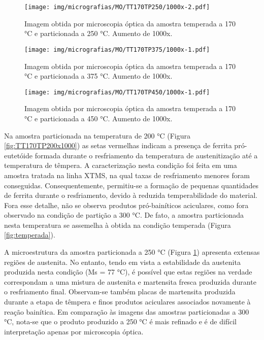 \begin{figure}
	\texttt{[image: img/micrografias/MO/TT170TP250/1000x-2.pdf]}
	\caption{Imagem obtida por microscopia óptica da amostra temperada a 170 °C e particionada a 250 °C. Aumento de 1000x.}
	\label{fig:TT170TP250x1000}
\end{figure}

\begin{figure}
	\texttt{[image: img/micrografias/MO/TT170TP375/1000x-1.pdf]}
	\caption{Imagem obtida por microscopia óptica da amostra temperada a 170 °C e particionada a 375 °C. Aumento de 1000x.}
	\label{fig:TT170TP375x1000}
\end{figure}

\begin{figure}
	\texttt{[image: img/micrografias/MO/TT170TP450/1000x-1.pdf]}
	\caption{Imagem obtida por microscopia óptica da amostra temperada a 170 °C e particionada a 450 °C. Aumento de 1000x.}
	\label{fig:TT170TP450x1000}
\end{figure}

Na amostra particionada na temperatura de 200 °C (Figura \ref{fig:TT170TP200x1000}) as setas vermelhas indicam a presença de ferrita pró-eutetóide formada durante o resfriamento da temperatura de austenitização até a temperatura de têmpera. A caracterização nesta condição foi feita em uma amostra tratada na linha XTMS, na qual taxas de resfriamento menores foram conseguidas. Consequentemente, permitiu-se a formação de pequenas quantidades de ferrita durante o resfriamento, devido à reduzida temperabilidade do material. Fora esse detalhe, não se observa produtos pró-bainíticos aciculares, como fora observado na condição de partição a 300 °C. De fato, a amostra particionada nesta temperatura se assemelha à obtida na condição temperada (Figura \ref{fig:temperada}).

A microestrutura da amostra particionada a 250 °C (Figura \ref{fig:TT170TP250x1000}) apresenta extensas regiões de austenita. No entanto, tendo em vista a estabilidade da austenita produzida nesta condição (Ms = 77 °C), é possível que estas regiões na verdade correspondam a uma mistura de austenita e martensita fresca produzida durante o resfriamento final. Observam-se também placas de martensita produzida durante a etapa de têmpera e finos produtos aciculares associados novamente à reação bainítica. Em comparação às imagens das amostras particionadas a 300 °C, nota-se que o produto produzido a 250 °C é mais refinado e é de difícil interpretação apenas por microscopia óptica.


